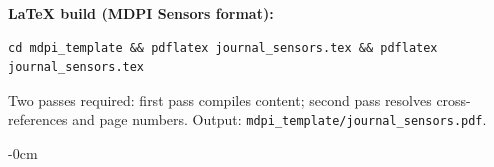 \documentclass[sensors,article,submit,pdftex,moreauthors]{Definitions/mdpi}
\begin{document}
\textbf{LaTeX build (MDPI Sensors format):}

\begin{verbatim}
cd mdpi_template && pdflatex journal_sensors.tex && pdflatex journal_sensors.tex
\end{verbatim}

Two passes required: first pass compiles content; second pass resolves cross-references
and page numbers. Output: \texttt{mdpi\_template/journal\_sensors.pdf}.

\begin{adjustwidth}{-\extralength}{0cm}


\end{adjustwidth}
\end{document}
